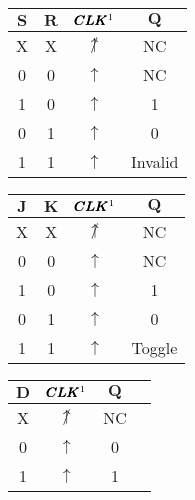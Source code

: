 \begin{multicols}{4}
      \begin{tabular}{|c|c|c|c|}
      \hline
      $\pmb{S}$ & $\pmb{R}$ & $\pmb{CLK}\FNM$ & $\pmb{Q}$ \\ \hline
      X         & X         & $\not\uparrow$ & NC        \\ \hline
      0         & 0         & $\uparrow$     & NC        \\ \hline
      1         & 0         & $\uparrow$     & 1         \\ \hline
      0         & 1         & $\uparrow$     & 0         \\ \hline
      1         & 1         & $\uparrow$     & Invalid   \\ \hline
      \end{tabular}   

      \begin{tabular}{|c|c|c|c|}
      \hline
      $\pmb{J}$ & $\pmb{K}$ & $\pmb{CLK}\SFNM$ & $\pmb{Q}$ \\ \hline
      X         & X         & $\not\uparrow$ & NC        \\ \hline
      0         & 0         & $\uparrow$     & NC        \\ \hline
      1         & 0         & $\uparrow$     & 1         \\ \hline
      0         & 1         & $\uparrow$     & 0         \\ \hline
      1         & 1         & $\uparrow$     & Toggle    \\ \hline
      \end{tabular}

      \begin{tabular}{|c|c|c|c|}
      \hline
      $\pmb{D}$ & $\pmb{CLK}\SFNM$ & $\pmb{Q}$ \\ \hline
      X         & $\not\uparrow$ & NC        \\ \hline
      0         & $\uparrow$     & 0         \\ \hline
      1         & $\uparrow$     & 1         \\ \hline
      \end{tabular}



\end{multicols}
